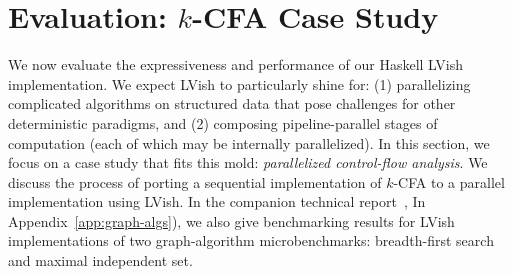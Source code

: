 \section{Evaluation: $k$-CFA Case Study}\label{section:eval}

We now evaluate 
the expressiveness and performance of our Haskell LVish implementation.
We expect LVish to particularly shine for:
  (1) parallelizing complicated algorithms on structured data that pose 
    challenges for other deterministic paradigms, and 
  (2) composing pipeline-parallel stages of computation 
     (each of which may be internally parallelized).
In this section, we focus on a case study that fits this mold:
\emph{parallelized control-flow analysis}.  We discuss the process of
porting a sequential implementation of $k$-CFA to a parallel
implementation using LVish.
\ifx\fulltr\undefined
In the companion technical
report~\cite{Freeze-TR}, 
\else
In Appendix~\ref{app:graph-algs}),
\fi
we also give benchmarking results for LVish
implementations of two graph-algorithm microbenchmarks: breadth-first
search and maximal independent set.








